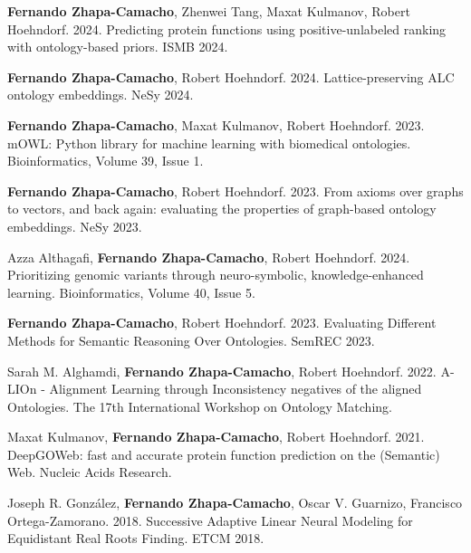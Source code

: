 

\begin{cvpubs}\textbf{Fernando Zhapa-Camacho}, Zhenwei Tang, Maxat Kulmanov, Robert Hoehndorf. 2024. Predicting protein functions using positive-unlabeled ranking with ontology-based priors. ISMB 2024.

\textbf{Fernando Zhapa-Camacho}, Robert Hoehndorf. 2024. Lattice-preserving ALC ontology embeddings. NeSy 2024.

\textbf{Fernando Zhapa-Camacho}, Maxat Kulmanov, Robert Hoehndorf. 2023. mOWL: Python library for machine learning with biomedical ontologies. Bioinformatics, Volume 39, Issue 1.

\textbf{Fernando Zhapa-Camacho}, Robert Hoehndorf. 2023. From axioms over graphs to vectors, and back again: evaluating the properties of graph-based ontology embeddings. NeSy 2023.

\end{cvpubs}


\begin{cvpubs}Azza Althagafi, \textbf{Fernando Zhapa-Camacho}, Robert Hoehndorf. 2024. Prioritizing genomic variants through neuro-symbolic, knowledge-enhanced learning. Bioinformatics, Volume 40, Issue 5.

\textbf{Fernando Zhapa-Camacho}, Robert Hoehndorf. 2023. Evaluating Different Methods for Semantic Reasoning Over Ontologies. SemREC 2023.

Sarah M. Alghamdi, \textbf{Fernando Zhapa-Camacho}, Robert Hoehndorf. 2022. A-LIOn - Alignment Learning through Inconsistency negatives of the aligned Ontologies. The 17th International Workshop on Ontology Matching.

Maxat Kulmanov, \textbf{Fernando Zhapa-Camacho}, Robert Hoehndorf. 2021. DeepGOWeb: fast and accurate protein function prediction on the (Semantic) Web. Nucleic Acids Research.

Joseph R. González, \textbf{Fernando Zhapa-Camacho}, Oscar V. Guarnizo, Francisco Ortega-Zamorano. 2018. Successive Adaptive Linear Neural Modeling for Equidistant Real Roots Finding. ETCM 2018.

\end{cvpubs}